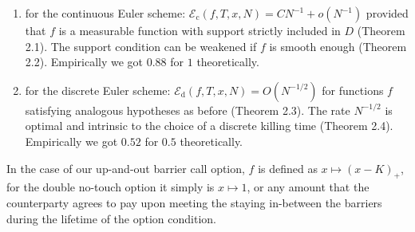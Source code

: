 \begin{enumerate}
    \item for the continuous Euler scheme: $\mathcal{E}_{\mathrm{c}}(f, T, x, N)=C N^{-1}+o\left(N^{-1}\right)$ provided that $f$ is a measurable function with support strictly included in $D$ (Theorem 2.1). The support condition can be weakened if $f$ is smooth enough (Theorem 2.2). Empirically we got $0.88$ for $1$ theoretically.

    \item for the discrete Euler scheme: $\mathcal{E}_{\mathrm{d}}(f, T, x, N)=O\left(N^{-1 / 2}\right)$ for functions $f$ satisfying analogous hypotheses as before (Theorem 2.3). The rate $N^{-1 / 2}$ is optimal and intrinsic to the choice of a discrete killing time (Theorem 2.4). Empirically we got $0.52$ for $0.5$ theoretically.

\end{enumerate}

In the case of our up-and-out barrier call option, $f$ is defined as $x \mapsto (x-K)_{+}$, for the double no-touch option it simply is $x \mapsto 1$, or any amount that the counterparty agrees to pay upon meeting the staying in-between the barriers during the lifetime of the option condition.